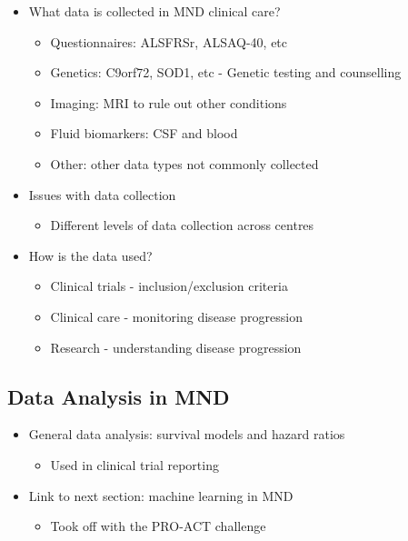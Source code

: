 \begin{itemize}
    \item What data is collected in MND clinical care?
    \begin{itemize}
        \item Questionnaires: ALSFRSr, ALSAQ-40, etc
        \item Genetics: C9orf72, SOD1, etc - Genetic testing and counselling
        \item Imaging: MRI to rule out other conditions
        \item Fluid biomarkers: CSF and blood
        \item Other: other data types not commonly collected
    \end{itemize}
    \item Issues with data collection
    \begin{itemize}
        \item Different levels of data collection across centres
    \end{itemize}
    \item How is the data used?
    \begin{itemize}
        \item Clinical trials - inclusion/exclusion criteria
        \item Clinical care - monitoring disease progression
        \item Research - understanding disease progression
    \end{itemize}
\end{itemize}


\subsection{Data Analysis in MND}

\begin{itemize}
    \item General data analysis: survival models and hazard ratios
    \begin{itemize}
        \item Used in clinical trial reporting
    \end{itemize}
    \item Link to next section: machine learning in MND
    \begin{itemize}
        \item Took off with the PRO-ACT challenge
    \end{itemize}
\end{itemize}

